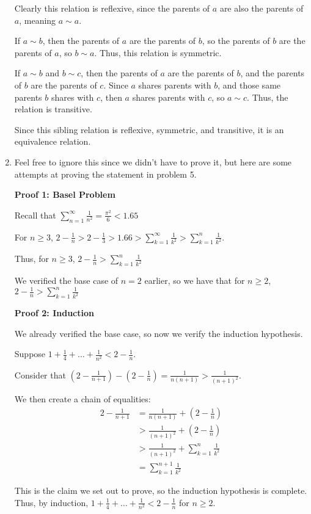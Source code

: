 \documentclass{article}
\begin{document}
\begin{enumerate}
    Clearly this relation is reflexive, since the parents of $a$ are also the parents of $a$, meaning $a \sim a$.

    If $a \sim b$, then the parents of $a$ are the parents of $b$, so the parents of $b$ are the parents of $a$, so $b \sim a$. Thus, this relation is symmetric.

    If $a \sim b$ and $b \sim c$, then the parents of $a$ are the parents of $b$, and the parents of $b$ are the parents of $c$. Since $a$ shares parents with $b$, and those same parents $b$ shares with $c$, then $a$ shares parents with $c$, so $a \sim c$. Thus, the relation is transitive. 

    Since this sibling relation is reflexive, symmetric, and transitive, it is an equivalence relation. 

    \item Feel free to ignore this since we didn't have to prove it, but here are some attempts at proving the statement in problem 5.

    \textbf{Proof 1: Basel Problem}

    Recall that $\sum_{n=1}^\infty \frac{1}{n^2} = \frac{\pi^2}{6} < 1.65$

    For $n \geq 3$, $2 - \frac{1}{n} > 2 - \frac{1}{3} > 1.66 > \sum_{k=1}^\infty \frac{1}{k^2} > \sum_{k=1}^n \frac{1}{k^2}$.

    Thus, for $n \geq 3$, $2 - \frac{1}{n} > \sum_{k=1}^n \frac{1}{k^2}$

    We verified the base case of $n=2$ earlier, so we have that for $n \geq 2$, $2 - \frac{1}{n} > \sum_{k=1}^n \frac{1}{k^2}$
    

    \textbf{Proof 2: Induction}

    We already verified the base case, so now we verify the induction hypothesis. 

    Suppose $1 + \frac{1}{4} + \dots + \frac{1}{n^2} < 2 - \frac{1}{n}$.

    Consider that $\left(2 - \frac{1}{n+1}\right) - \left(2 - \frac{1}{n} \right) = \frac{1}{n(n + 1)} > \frac{1}{(n+1)^2}$.

    We then create a chain of equalities:
    \begin{align*}
        2 - \frac{1}{n+1} &= \frac{1}{n(n+1)} + \left(2 - \frac{1}{n}\right) \\
        &> \frac{1}{(n+1)^2} + \left(2 - \frac{1}{n}\right) \\
        &> \frac{1}{(n+1)^2} + \sum_{k=1}^n \frac{1}{k^2} \\
        &= \sum_{k=1}^{n+1}\frac{1}{k^2}
    \end{align*}

    This is the claim we set out to prove, so the induction hypothesis is complete. Thus, by induction, $1 + \frac{1}{4} + \dots + \frac{1}{n^2} < 2 - \frac{1}{n}$ for $n \geq 2$.

    

    
    
    
\end{enumerate}
\end{document}
